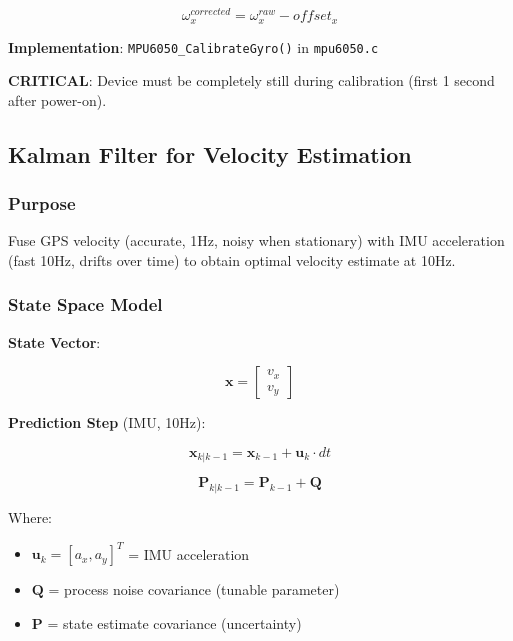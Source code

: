 \documentclass[11pt,a4paper]{article}
\begin{document}
\begin{equation}
\omega_x^{corrected} = \omega_x^{raw} - offset_x
\end{equation}

\textbf{Implementation}: \texttt{MPU6050\_CalibrateGyro()} in \texttt{mpu6050.c}

\textbf{CRITICAL}: Device must be completely still during calibration (first 1 second after power-on).

\subsection{Kalman Filter for Velocity Estimation}

\subsubsection{Purpose}

Fuse GPS velocity (accurate, 1Hz, noisy when stationary) with IMU acceleration (fast 10Hz, drifts over time) to obtain optimal velocity estimate at 10Hz.

\subsubsection{State Space Model}

\textbf{State Vector}:

\begin{equation}
\mathbf{x} = \begin{bmatrix} v_x \\ v_y \end{bmatrix}
\end{equation}

\textbf{Prediction Step} (IMU, 10Hz):

\begin{equation}
\mathbf{x}_{k|k-1} = \mathbf{x}_{k-1} + \mathbf{u}_k \cdot dt
\end{equation}

\begin{equation}
\mathbf{P}_{k|k-1} = \mathbf{P}_{k-1} + \mathbf{Q}
\end{equation}

Where:
\begin{itemize}
    \item $\mathbf{u}_k = [a_x, a_y]^T$ = IMU acceleration
    \item $\mathbf{Q}$ = process noise covariance (tunable parameter)
    \item $\mathbf{P}$ = state estimate covariance (uncertainty)
\end{itemize}
\end{document}
